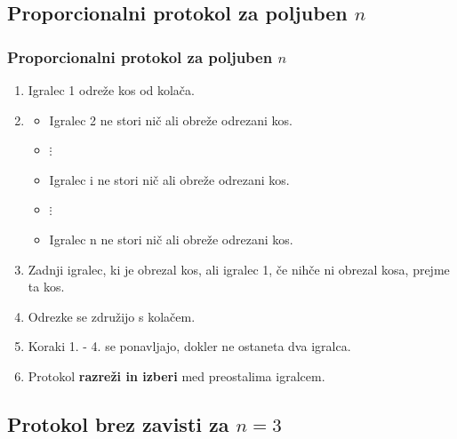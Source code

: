 \documentclass{beamer}
\begin{document}
	\subsection{Proporcionalni protokol za poljuben $n$}

	\begin{frame}
		\frametitle{Proporcionalni protokol za poljuben $n$}
		\begin{enumerate}
			\item Igralec 1 odreže kos od kolača.
			
			\item \begin{itemize}
				
				\item Igralec 2 ne stori nič ali obreže odrezani kos.
				
				\item[] $\vdots$
				
				\item Igralec i ne stori nič ali obreže odrezani kos.
				
				\item[] $\vdots$
				
				\item Igralec n ne stori nič ali obreže odrezani kos.
				
			\end{itemize}
			
			\item Zadnji igralec, ki je obrezal kos, ali igralec 1, če nihče ni obrezal kosa, prejme ta kos. 
			
			\item Odrezke se združijo s kolačem.
			
			\item Koraki 1. - 4. se ponavljajo, dokler ne ostaneta dva igralca.
			
			\item Protokol \textbf{razreži in izberi} med preostalima igralcem.
		\end{enumerate}
	\end{frame}

	\subsection{Protokol brez zavisti za $n = 3$}
\end{document}

